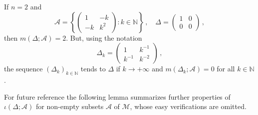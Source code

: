 \documentclass{amsart}
\begin{document}
\begin{exe}
 If $n=2$ and
\[  
   {\mathcal A} = \left\{
        \left(\begin{array}{cc}
               1 & -k \\
              -k & k^2
              \end{array}
       \right) : k\in {\mathbb N} \right\} \, , \quad
    \Delta = 
       \left(\begin{array}{cc}
               1 & 0 \\   
               0 & 0
             \end{array}
       \right) \, , 
\]
then $m(\Delta;{\mathcal A}) = 2$. But, using the notation
\[  
    \Delta_k = 
      \left(\begin{array}{cc}
             1 & k^{-1} \\
             k^{-1} & k^{-2}
            \end{array}
      \right) \, ,   
 \]
the sequence $(\Delta_k)_{k\in {\mathbb N}}$ tends to $\Delta$ if $k\to+\infty$ and $m(\Delta_k;{\mathcal A}) = 0$
for all $k\in {\mathbb N}$.
\end{exe}

For future reference the following lemma summarizes further properties of $\iota(\Delta;{\mathcal A})$ for non-empty subsets $\mathcal A$ of $\mathcal M$, whose easy verifications are omitted.
\end{document}
